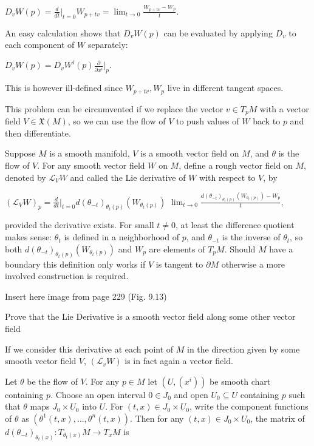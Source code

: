 \(D_v W(p) = \frac{d}{dt} \bigg|_{t=0} W_{p + tv} = \lim_{t \to 0} \frac{W_{p + tv} - W_p}{t}.\)

An easy calculation shows that \( D_v W(p) \) can be evaluated by applying \( D_v \) 
to each component of \( W \) separately:

\( D_v W(p) = D_v W^i(p) \frac{\partial}{\partial x^i} \bigg|_p. \)

This is however ill-defined since \( W_{p + tv}, W_p \) live in different tangent spaces.

This problem can be circumvented if we replace the vector \(v \in T_pM\) with a vector field \(V \in \mathfrak{X}(M)\), 
so we can use the flow of \(V\) to push values of \(W\) back to \(p\) and then differentiate. 

Suppose \(M\) is a smooth manifold, \(V\) is a smooth vector field on \(M\), and \(\theta\) is the flow of \(V\). 
For any smooth vector field \(W\) on \(M\), define a rough vector field on \(M\), 
denoted by \(\mathcal{L}_V W\) and called the Lie derivative of \(W\) with respect to \(V\), by

\((\mathcal{L}_V W)_p = \frac{d}{dt}\bigg|_{t=0} d(\theta_{-t})_{\theta_t(p)}(W_{\theta_t(p)})\) 
\(\lim_{t \to 0} \frac{d(\theta_{-t})_{\theta_t(p)}(W_{\theta_t(p)}) - W_p}{t}, \)

provided the derivative exists. For small \(t \neq 0\), at least the difference quotient makes sense: 
\(\theta_t\) is defined in a neighborhood of \(p\), and \(\theta_{-t}\) is the inverse of \(\theta_t\), 
so both \(d(\theta_{-t})_{\theta_t(p)}(W_{\theta_t(p)})\) and \(W_p\) are elements of \(T_pM\).
Should \( M \) have a boundary this definition only works if \( V \) is tangent to \( \partial M \)
otherwise a more involved construction is required.


Insert here image from page 229 (Fig. 9.13)

Prove that the Lie Derivative is a smooth vector field along some other vector field

If we consider this derivative at each point of \( M \) in the direction given by some smooth
vector field \( V \), \( (\mathcal{L}_v W) \) is in fact again a vector field.

Let \( \theta \) be the flow of \( V \). For any \( p \in M \) let \( (U, (x^i)) \)
be smooth chart containing \( p \). Choose an open interval \(0 \in J_0\) and open \(U_{0} \subseteq U\)
containing \(p\) such that \(\theta\) maps \(J_0 \times U_0\) into \(U\). 
For \((t, x) \in J_0 \times U_0\), write the component functions of \(\theta\) as 
\((\theta^1(t,x), \dots, \theta^n(t, x))\). Then for any \((t, x) \in J_0 \times U_0\), 
the matrix of \(d(\theta_{-t})_{\theta_t(x)} : T_{\theta_t(x)}M \to T_x M\) is

